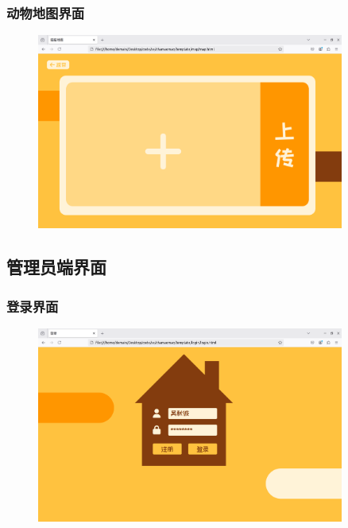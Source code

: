 \documentclass[12pt,a4paper,UTF8]{article}
\begin{document}
\subsubsection{动物地图界面}

\begin{figure}[H]
  \centering
  \includegraphics[width=0.9\textwidth]{figures/UserMap.png}
\end{figure}

\subsection{管理员端界面}

\subsubsection{登录界面}

\begin{figure}[H]
  \centering
  \includegraphics[width=0.9\textwidth]{figures/UserLogin.png}
\end{figure}
\end{document}
